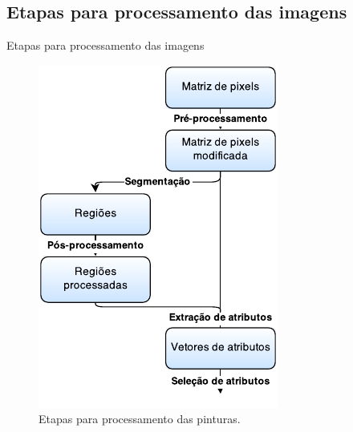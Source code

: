 \documentclass{beamer}
\begin{document}
\subsection{Etapas para processamento das imagens}
\begin{frame}{Etapas para processamento das imagens}

\begin{figure}[ht!]
\begin{center}
\includegraphics[scale=0.8]{figs/etapas_pdi2} 
\caption{Etapas para processamento das pinturas.}
\label{fig:etapas-pdi}
        
\end{center}
\end{figure}

\end{frame}
\end{document}
